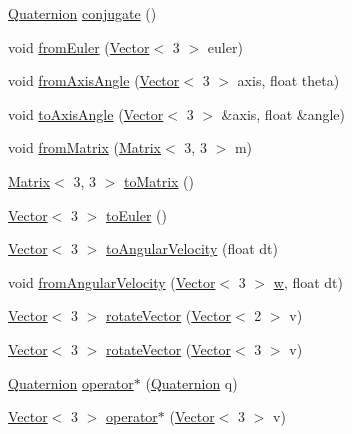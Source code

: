 \begin{DoxyCompactItemize}
\item 
\hyperlink{classetk_1_1_quaternion}{Quaternion} \hyperlink{classetk_1_1_quaternion_ad5fa5e5d2edbcee852480e63053daf80}{conjugate} ()
\item 
void \hyperlink{classetk_1_1_quaternion_ae191a92873826ad1de7495810a0ed1a9}{from\-Euler} (\hyperlink{classetk_1_1_vector}{Vector}$<$ 3 $>$ euler)
\item 
void \hyperlink{classetk_1_1_quaternion_a682f23ae7b2d38e78660456d10937306}{from\-Axis\-Angle} (\hyperlink{classetk_1_1_vector}{Vector}$<$ 3 $>$ axis, float theta)
\item 
void \hyperlink{classetk_1_1_quaternion_adc1333e656e74c33f3f1169a32614fb0}{to\-Axis\-Angle} (\hyperlink{classetk_1_1_vector}{Vector}$<$ 3 $>$ \&axis, float \&angle)
\item 
void \hyperlink{classetk_1_1_quaternion_a6dd99f266dfb3338e9fa3a61fac8b046}{from\-Matrix} (\hyperlink{classetk_1_1_matrix}{Matrix}$<$ 3, 3 $>$ m)
\item 
\hyperlink{classetk_1_1_matrix}{Matrix}$<$ 3, 3 $>$ \hyperlink{classetk_1_1_quaternion_a3f6d295725e34994abcc00ea60e19658}{to\-Matrix} ()
\item 
\hyperlink{classetk_1_1_vector}{Vector}$<$ 3 $>$ \hyperlink{classetk_1_1_quaternion_a81ad691231786ab3a13157bfbc6de1ec}{to\-Euler} ()
\item 
\hyperlink{classetk_1_1_vector}{Vector}$<$ 3 $>$ \hyperlink{classetk_1_1_quaternion_a594a9d43225c192559670a6038cbb136}{to\-Angular\-Velocity} (float dt)
\item 
void \hyperlink{classetk_1_1_quaternion_a5cb0bc620fc02826964bf53ddde65cb7}{from\-Angular\-Velocity} (\hyperlink{classetk_1_1_vector}{Vector}$<$ 3 $>$ \hyperlink{classetk_1_1_quaternion_ae8087566ada295e00a13be97a090acc3}{w}, float dt)
\item 
\hyperlink{classetk_1_1_vector}{Vector}$<$ 3 $>$ \hyperlink{classetk_1_1_quaternion_a8c5bdf49977cb3c9c9e3189b75b224c2}{rotate\-Vector} (\hyperlink{classetk_1_1_vector}{Vector}$<$ 2 $>$ v)
\item 
\hyperlink{classetk_1_1_vector}{Vector}$<$ 3 $>$ \hyperlink{classetk_1_1_quaternion_afa4cab588a1fdfa2c2ca0e2f60473063}{rotate\-Vector} (\hyperlink{classetk_1_1_vector}{Vector}$<$ 3 $>$ v)
\item 
\hyperlink{classetk_1_1_quaternion}{Quaternion} \hyperlink{classetk_1_1_quaternion_acfd5de59138eb00b43d5c2633152d72d}{operator$\ast$} (\hyperlink{classetk_1_1_quaternion}{Quaternion} q)
\item 
\hyperlink{classetk_1_1_vector}{Vector}$<$ 3 $>$ \hyperlink{classetk_1_1_quaternion_a7ed0b672fabb560607b8260429b3e4af}{operator$\ast$} (\hyperlink{classetk_1_1_vector}{Vector}$<$ 3 $>$ v)

\end{DoxyCompactItemize}

